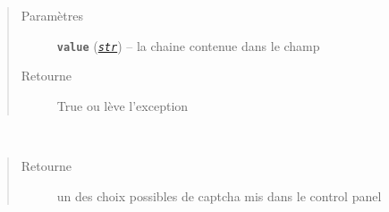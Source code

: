 \documentclass[letterpaper,10pt,french]{sphinxmanual}
\begin{document}
\begin{fulllineitems}
\label{behavior:collective.behavior.textcaptcha.behaviors.textcaptcha.SampleValidator}~

\begin{fulllineitems}
\label{behavior:collective.behavior.textcaptcha.behaviors.textcaptcha.SampleValidator.validate}~\begin{quote}\begin{description}
\item[{Paramètres}] \leavevmode
\textbf{\texttt{value}} (\href{https://docs.python.org/library/functions.html\#str}{\emph{\texttt{str}}}) -- la chaine contenue dans le champ 

\item[{Retourne}] \leavevmode
True ou lève l'exception 

\end{description}\end{quote}

\end{fulllineitems}


\end{fulllineitems}


\begin{fulllineitems}
\label{behavior:collective.behavior.textcaptcha.behaviors.textcaptcha.randomCaptcha}
\end{fulllineitems}


\begin{fulllineitems}
\label{behavior:collective.behavior.textcaptcha.behaviors.textcaptcha.randomCaptchaLabel}~\begin{quote}\begin{description}
\item[{Retourne}] \leavevmode
un des choix possibles de captcha mis dans le control panel

\end{description}\end{quote}

\end{fulllineitems}
\end{document}
